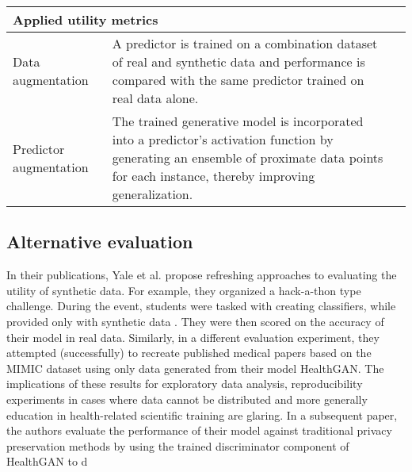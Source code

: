 \begin{table}
\begin{tabular}{@{} p{} p{} p{} @{}}
        \multicolumn{3}{Y}{\textbf{Applied utility metrics}}\\ \midrule

        
        Data augmentation & A predictor is trained on a combination dataset of real and synthetic data and performance is compared with the same predictor trained on real data alone. & \cite{Yoon2018-mo}\\
        
        Predictor augmentation & The trained generative model is incorporated into a predictor's activation function by generating an ensemble of proximate data points for each instance, thereby improving generalization. & \cite{Che_2017}\\
        
        \bottomrule
        
        \end{tabular}
\end{table}

\subsection{Alternative evaluation}
In their publications, Yale et al. propose refreshing approaches to evaluating the utility of synthetic data. For example, they organized a hack-a-thon type challenge. During the event, students were tasked with creating classifiers, while provided only with synthetic data \cite{Yale_2020}. They were then scored on the accuracy of their model in real data. Similarly, in a different evaluation experiment, they attempted (successfully) to recreate published medical papers based on the MIMIC dataset using only data generated from their model HealthGAN. The implications of these results for exploratory data analysis, reproducibility experiments in cases where data cannot be distributed and more generally education in health-related scientific training are glaring. In a subsequent paper, the authors evaluate the performance of their model against traditional privacy preservation methods by using the trained discriminator component of HealthGAN to d